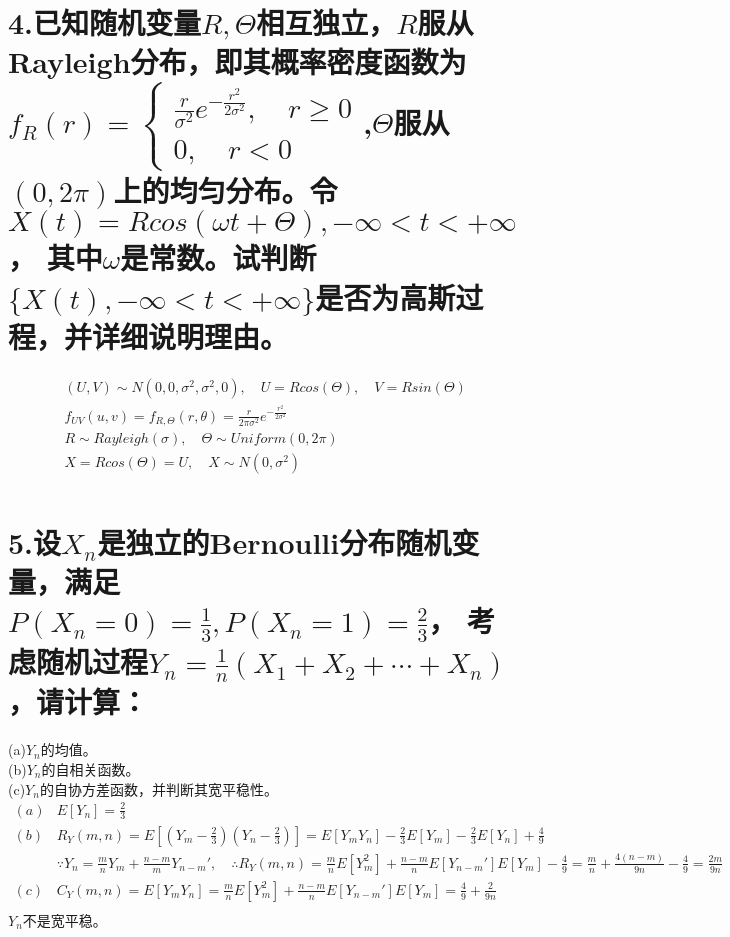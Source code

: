 \documentclass[UTF8]{ctexart}
\begin{document}
\section*{4.已知随机变量$R,\Theta$相互独立，$R$服从Rayleigh分布，即其概率密度函数为$f_R(r)=\begin{cases}
      \frac{r}{\sigma^2}e^{-\frac{r^2}{2\sigma^2}},\quad r\geq0 \\
      0,\quad r<0
    \end{cases}$,$\Theta$服从$(0,2\pi)$上的均匀分布。令$X(t)=Rcos(\omega t+\Theta),-\infty<t<+\infty$，
  其中$\omega$是常数。试判断$\{X(t),-\infty<t<+\infty\}$是否为高斯过程，并详细说明理由。}
\begin{equation*}
  \begin{aligned}
     & (U,V)\sim N(0,0,\sigma^2,\sigma^2,0),\quad U=Rcos(\Theta),\quad V=Rsin(\Theta)      \\
     & f_{UV}(u,v)=f_{R,\Theta}(r,\theta)=\frac{r}{2\pi\sigma^2}e^{-\frac{r^2}{2\sigma^2}} \\
     & R\sim Rayleigh(\sigma),\quad\Theta\sim Uniform(0,2\pi)                              \\
     & X=Rcos(\Theta)=U,\quad X\sim N(0,\sigma^2)                                          \\
  \end{aligned}
\end{equation*}
\section*{5.设$X_n$是独立的Bernoulli分布随机变量，满足$P(X_n=0)=\frac{1}{3},P(X_n=1)=\frac{2}{3}$，
  考虑随机过程$Y_n=\frac{1}{n}(X_1+X_2+\cdots+X_n)$，请计算：}
 (a)$Y_n$的均值。\\
(b)$Y_n$的自相关函数。\\
(c)$Y_n$的自协方差函数，并判断其宽平稳性。\\
\begin{equation*}
  \begin{aligned}
    (a) & E[Y_n]=\frac{2}{3}                                                         \\
    (b) & R_Y(m,n)=E[(Y_m-\frac{2}{3})(Y_n-\frac{2}{3})]=E[Y_mY_n]-\frac{2}{3}E[Y_m]
    -\frac{2}{3}E[Y_n]+\frac{4}{9}                                                   \\
        & \because Y_n=\frac{m}{n}Y_m+\frac{n-m}{m}Y_{n-m}',\quad\therefore R_Y(m,n)
    =\frac{m}{n}E[Y_m^2]+\frac{n-m}{n}E[Y_{n-m}']E[Y_m]-\frac{4}{9}=\frac{m}{n}
    +\frac{4(n-m)}{9n}-\frac{4}{9}=\frac{2m}{9n}                                     \\
    (c) & C_Y(m,n)=E[Y_mY_n]=\frac{m}{n}E[Y_m^2]+\frac{n-m}{n}E[Y_{n-m}']E[Y_m]
    =\frac{4}{9}+\frac{2}{9n}                                                        \\
  \end{aligned}
\end{equation*}
$Y_n$不是宽平稳。\\
\end{document}
